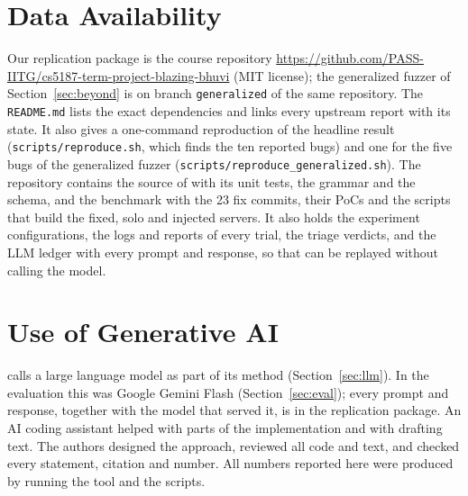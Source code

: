 \section*{Data Availability}
\label{sec:data}
Our replication package is the course repository
\url{https://github.com/PASS-IITG/cs5187-term-project-blazing-bhuvi} (MIT
license); the generalized fuzzer of Section~\ref{sec:beyond} is on branch
\texttt{generalized} of the same repository. The \texttt{README.md} lists the
exact dependencies and links every upstream report with its state. It also
gives a one-command reproduction of the headline result
(\texttt{scripts/reproduce.sh}, which finds the ten reported \pg bugs) and one
for the five bugs of the generalized fuzzer
(\texttt{scripts/reproduce\_generalized.sh}). The repository contains the source of \tool with its unit tests,
the grammar and the schema, and the benchmark with the 23 fix commits, their
PoCs and the scripts that build the fixed, solo and injected servers. It also
holds the experiment configurations, the logs and reports of every trial, the
triage verdicts, and the LLM ledger with every prompt and response, so that
 can be replayed without calling the model.

\section*{Use of Generative AI}
\tool calls a large language model as part of its method
(Section~\ref{sec:llm}). In the evaluation this was Google Gemini Flash
(Section~\ref{sec:eval}); every prompt and response, together with the model
that served it, is in the replication package. An AI coding assistant helped
with parts of the implementation and with drafting text. The authors designed
the approach, reviewed all code and text, and checked every statement, citation
and number. All numbers reported here were produced by running the tool and the
scripts.

